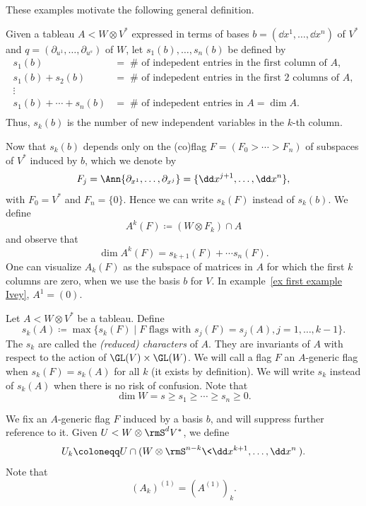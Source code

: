 These examples motivate the following general definition.

\begin{defn}
    Given a tableau $A<W\otimes V^\ast$ expressed in terms of bases $b=(\dd x^1,\ldots,\dd x^n)$ of $V^\ast$ and $q=(\partial_{u^1},\ldots,\partial_{u^s})$ of $W$, let $s_1(b),\ldots,s_n(b)$ be defined by 
    \begin{align}
        s_1(b)&=\; \#\text{ of indepedent entries in the first column of }A,\\
        s_1(b)+s_2(b)&=\; \#\text{ of indepedent entries in the first 2 columns of }A,\\
        \vdots &\\
        s_1(b)+\cdots +s_n(b)&=\; \#\text{ of indepedent entries in }A=\dim A.\\
    \end{align}
    Thus, $s_k(b)$ is the number of new independent variables in the $k$-th column.
\end{defn}

Now that $s_k(b)$ depends only on the (co)flag $F=(F_0>\cdots >F_n)$ of subspaces of $V^\ast$ induced by $b$, which we denote by 
\[F_j=\Ann\{\partial_{x^1},\ldots,\partial_{x^j}\}=\{\dd x^{j+1},\ldots, \dd x^n\},\]
with $F_0=V^\ast$ and $F_n=\{0\}$. Hence we can write $s_k(F)$ instead of $s_k(b)$. We define 
\[A^k(F)\coloneqq (W\otimes F_k)\cap A\]
and observe that 
\[\dim A^k(F)=s_{k+1}(F)+\cdots s_n(F).\label{eq 5.17 Ivey}\]
One can visualize $A_k(F)$ as the subspace of matrices in $A$ for which the first $k$ columns are zero, when we use the basis $b$ for $V$. In example~\ref{ex first example Ivey}, $A^1=(0)$.

\begin{defn}
    Let $A<W\otimes V^\ast$ be a tableau. Define 
    \[s_k(A)\coloneqq \max\{s_k(F)\mid F\text{ flags with }s_j(F)=s_j(A),j=1,\ldots,k-1\}.\]
    The $s_k$ are called the \emph{(reduced) characters} of $A$. They are invariants of $A$ with respect to the action of $\GL(V)\times\GL(W)$. We will call a flag $F$ an $A$-generic flag when $s_k(F)=s_k(A)$ for all $k$ (it exists by definition). We will write $s_k$ instead of $s_k(A)$ when there is no risk of confusion. Note that 
    \[\dim W=s\geq s_1\geq \cdots \geq s_n\geq 0.\]
\end{defn}

We fix an $A$-generic flag $F$ induced by a basis $b$, and will suppress further reference to it. Given $U< W\otimes \rmS^d V^\ast$, we define 
\[U_k\coloneqq U\cap (W\otimes \rmS^{n-k}\<\dd x^{k+1},\ldots,\dd x^n\>).\]
Note that 
\[(A_k)^{(1)}=(A^{(1)})_k.\]

